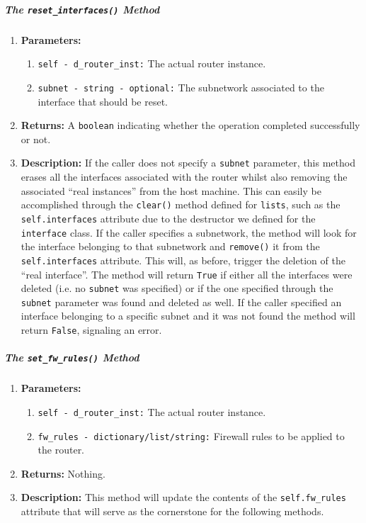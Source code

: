         \subparagraph{The \texttt{reset\_interfaces()} Method}
            \begin{enumerate}
                \item \textbf{Parameters:}
                \begin{enumerate}
                    \item \texttt{self - d\_router\_inst:} The actual router instance.
                    \item \texttt{subnet - string - optional:} The subnetwork associated to the interface that should be reset.
                \end{enumerate}
                \item \textbf{Returns:} A \texttt{boolean} indicating whether the operation completed successfully or not.
                \item \textbf{Description:} If the caller does not specify a \texttt{subnet} parameter, this method erases all the interfaces associated with the router whilst also removing the associated ``real instances'' from the host machine. This can easily be accomplished through the \texttt{clear()} \cite{bib:python-datastructures} method defined for \texttt{lists}, such as the \texttt{self.interfaces} attribute due to the destructor we defined for the \texttt{interface} class. If the caller specifies a subnetwork, the method will look for the interface belonging to that subnetwork and \texttt{remove()} it from the \texttt{self.interfaces} attribute. This will, as before, trigger the deletion of the ``real interface''. The method will return \texttt{True} if either all the interfaces were deleted (i.e. no \texttt{subnet} was specified) or if the one specified through the \texttt{subnet} parameter was found and deleted as well. If the caller specified an interface belonging to a specific subnet and it was not found the method will return \texttt{False}, signaling an error.
            \end{enumerate}

        \subparagraph{The \texttt{set\_fw\_rules()} Method}
            \begin{enumerate}
                \item \textbf{Parameters:}
                \begin{enumerate}
                    \item \texttt{self - d\_router\_inst:} The actual router instance.
                    \item \texttt{fw\_rules - dictionary/list/string:} Firewall rules to be applied to the router.
                \end{enumerate}
                \item \textbf{Returns:} Nothing.
                \item \textbf{Description:} This method will update the contents of the \texttt{self.fw\_rules} attribute that will serve as the cornerstone for the following methods.
            \end{enumerate}

